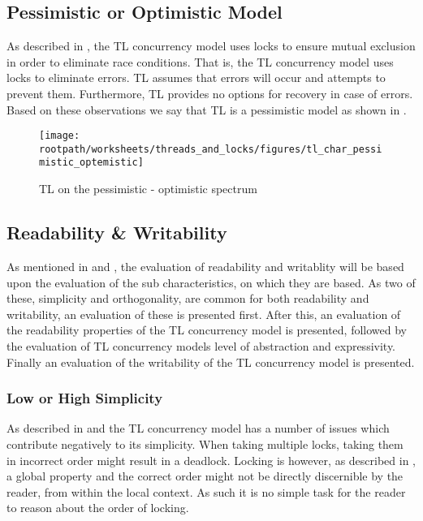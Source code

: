\subsection{Pessimistic or Optimistic Model}
As described in , the \ac{TL} concurrency model uses locks to ensure mutual exclusion in order to eliminate race conditions. That is, the \ac{TL} concurrency model uses locks to eliminate errors. \ac{TL} assumes that errors will occur and attempts to prevent them. Furthermore, \ac{TL} provides no options for recovery in case of errors. Based on these observations we say that \ac{TL} is a pessimistic model as shown in .

\begin{figure}[htbp]
\centering
 \texttt{[image: \\rootpath/worksheets/threads\_and\_locks/figures/tl\_char\_pessimistic\_optemistic]} 
 \caption{\ac{TL} on the pessimistic - optimistic spectrum}
\label{fig:char_pes_opti}
\end{figure}

\subsection{Readability \& Writability}\label{subsec:tl_charac_read_and_write}
As mentioned in  and , the evaluation of readability and writablity will be based upon the evaluation of the sub characteristics, on which they are based. As two of these, simplicity and orthogonality, are common for both readability and writability, an evaluation of these is presented first. After this, an evaluation of the readability properties of the \ac{TL} concurrency model is presented, followed by the evaluation of \ac{TL} concurrency models level of abstraction and expressivity. Finally an evaluation of the writability of the \ac{TL} concurrency model is presented.

\subsubsection{Low or High Simplicity}\label{subsec:tl_simplicity_read}
As described in  and  the \ac{TL} concurrency model has a number of issues which contribute negatively to its simplicity. When taking multiple locks, taking them in incorrect order might result in a deadlock. Locking is however, as described in , a global property and the correct order might not be directly discernible by the reader, from within the local context. As such it is no simple task for the reader to reason about the order of locking.

